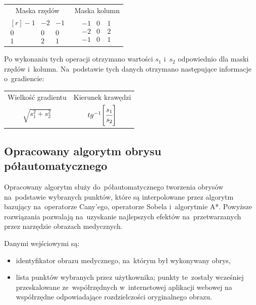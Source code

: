 \documentclass[a4paper,11pt,twoside,openright]{report}
\theoremstyle{definition}
\begin{document}
\begin{table}[h!]
\centering
\setlength{\tabcolsep}{40pt}
\begin{tabular} { c c }
  Maska rzędów & Maska kolumn \\
$
\begin{matrix*}[r]
-1 & -2 & -1 \\
0 & 0~& 0~\\
1 & 2~& 1
\end{matrix*}$
&
$\begin{matrix}
-1 & 0~& 1~\\
-2 & 0~& 2~\\
-1 & 0~& 1
\end{matrix}$
\end{tabular}
\end{table}

Po wykonaniu tych operacji otrzymano wartości $s_1$ i~$s_2$ odpowiednio dla maski
rzędów i~kolumn. Na~podstawie tych danych otrzymano następujące informacje o~gradiencie:
\begin{table}[h!]
\centering
\setlength{\tabcolsep}{30pt}
\begin{tabular} { c c }
  Wielkość gradientu & Kierunek krawędzi \\
$\sqrt{s_1^2 + s_2^2}$ & $tg^{-1} \Bigg[ {\cfrac{s_1}{s_2}} \Bigg]$
\end{tabular}
\end{table}

\subsection {Opracowany algorytm obrysu półautomatycznego}

Opracowany algorytm służy do~półautomatycznego tworzenia obrysów na~podstawie wybranych punktów,
które są interpolowane przez algorytm bazujący na~operatorze Cany'ego, operatorze Sobela i~algorytmie A*.
Powyższe rozwiązania pozwalają na~uzyskanie najlepszych efektów na~przetwarzanych
przez narzędzie obrazach medycznych.

Danymi wejściowymi są:
\begin{itemize}[noitemsep]
\item {identyfikator obrazu medycznego, na~którym był wykonywany obrys,}
\item {lista punktów wybranych przez użytkownika; punkty te~zostały wcześniej
przeskalowane ze~współrzędnych w~internetowej aplikacji webowej
na współrzędne odpowiadające rozdzielczości oryginalnego obrazu.}
\end{itemize}
\end{document}

